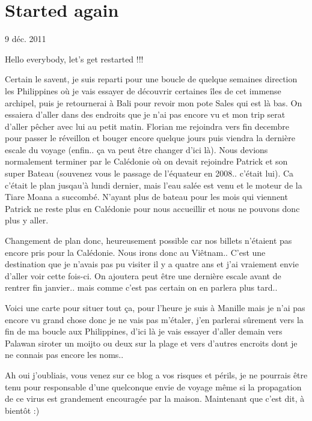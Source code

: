 \section{Started again}

9 déc. 2011

\begin{multicols}{2}

Hello everybody, let's get restarted !!!

Certain le savent, je suis reparti pour une boucle de quelque semaines direction les Philippines où je vais essayer de découvrir certaines îles de cet immense archipel, puis je retournerai à Bali pour revoir mon pote Sales qui est là bas. On essaiera d'aller dans des endroits que je n'ai pas encore vu et mon trip serat d'aller pêcher avec lui au petit matin. Florian me rejoindra vers fin decembre pour passer le réveillon et bouger encore quelque jours puis viendra la dernière escale du voyage (enfin.. ça va peut être changer d'ici là). Nous devions normalement terminer par le Calédonie où on devait rejoindre Patrick et son super Bateau (souvenez vous le passage de l'équateur en 2008.. c'était lui). Ca c'était le plan jusqau'à lundi dernier, mais l'eau salée est venu et le moteur de la Tiare Moana a succombé. N'ayant plus de bateau pour les mois qui viennent Patrick ne reste plus en Calédonie pour nous accueillir et nous ne pouvons donc plus y aller.

Changement de plan donc, heureusement possible car nos billets n'étaient pas encore pris pour la Calédonie. Nous irons donc au Viêtnam.. C'est une destination que je n'avais pas pu visiter il y a quatre ans et j'ai vraiement envie d'aller voir cette fois-ci. On ajoutera peut être une dernière escale avant de rentrer fin janvier.. mais comme c'est pas certain on en parlera plus tard..

Voici une carte pour situer tout ça, pour l'heure je suis à Manille mais je n'ai pas encore vu grand chose donc je ne vais pas m'étaler, j'en parlerai sûrement vers la fin de ma boucle aux Philippines, d'ici là je vais essayer d'aller demain vers Palawan siroter un moijto ou deux sur la plage et vers d'autres encroits dont je ne connais pas encore les noms..


Ah oui j'oubliais, vous venez sur ce blog a vos risques et périls, je ne pourrais être tenu pour responsable d'une quelconque envie de voyage même si la propagation de ce virus est grandement encouragée par la maison. Maintenant que c'est dit, à bientôt :)

\end{multicols}


